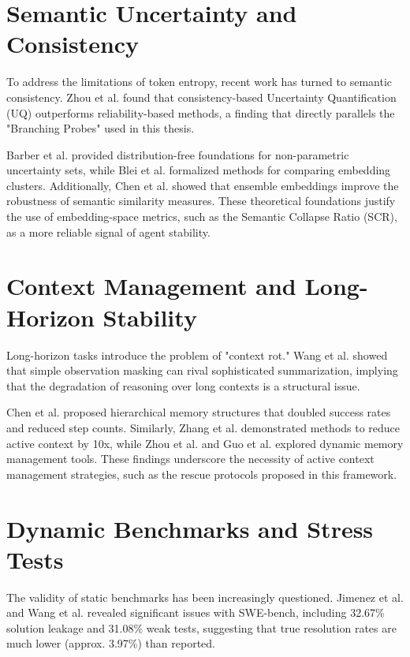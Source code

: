 \documentclass[12pt,a4paper]{report}
\begin{document}
\section{Semantic Uncertainty and Consistency}
To address the limitations of token entropy, recent work has turned to semantic consistency. Zhou et al. \cite{Zhou2024Consistency} found that consistency-based Uncertainty Quantification (UQ) outperforms reliability-based methods, a finding that directly parallels the "Branching Probes" used in this thesis.

Barber et al. \cite{Barber2022ConformalPrediction} provided distribution-free foundations for non-parametric uncertainty sets, while Blei et al. \cite{Blei2019Model} formalized methods for comparing embedding clusters. Additionally, Chen et al. \cite{Chen2025Ensemble} showed that ensemble embeddings improve the robustness of semantic similarity measures. These theoretical foundations justify the use of embedding-space metrics, such as the Semantic Collapse Ratio (SCR), as a more reliable signal of agent stability.

\section{Context Management and Long-Horizon Stability}
Long-horizon tasks introduce the problem of "context rot." Wang et al. \cite{Wang2025ComplexityTrap} showed that simple observation masking can rival sophisticated summarization, implying that the degradation of reasoning over long contexts is a structural issue.

Chen et al. \cite{Chen2024HiAgent} proposed hierarchical memory structures that doubled success rates and reduced step counts. Similarly, Zhang et al. \cite{Zhang2025ContextFolding} demonstrated methods to reduce active context by 10x, while Zhou et al. \cite{Zhou2025MemTool} and Guo et al. \cite{Guo2024MOSS} explored dynamic memory management tools. These findings underscore the necessity of active context management strategies, such as the rescue protocols proposed in this framework.

\section{Dynamic Benchmarks and Stress Tests}
The validity of static benchmarks has been increasingly questioned. Jimenez et al. \cite{Jimenez2024SWEBenchPlus} and Wang et al. \cite{Wang2025SavingSWE} revealed significant issues with SWE-bench, including 32.67\% solution leakage and 31.08\% weak tests, suggesting that true resolution rates are much lower (approx. 3.97\%) than reported.
\end{document}
